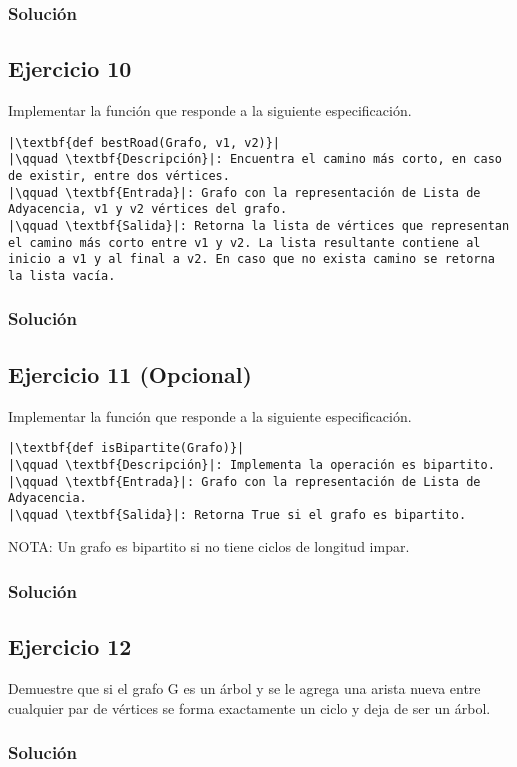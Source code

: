 \documentclass{article}
\begin{document}
\subsubsection*{Solución}


\subsection*{Ejercicio 10}
Implementar la función que responde a la siguiente especificación.
\begin{lstlisting}
|\textbf{def bestRoad(Grafo, v1, v2)}|
|\qquad \textbf{Descripción}|: Encuentra el camino más corto, en caso de existir, entre dos vértices.
|\qquad \textbf{Entrada}|: Grafo con la representación de Lista de Adyacencia, v1 y v2 vértices del grafo.
|\qquad \textbf{Salida}|: Retorna la lista de vértices que representan el camino más corto entre v1 y v2. La lista resultante contiene al inicio a v1 y al final a v2. En caso que no exista camino se retorna la lista vacía.
\end{lstlisting}
\subsubsection*{Solución}


\subsection*{Ejercicio 11 (Opcional)}
Implementar la función que responde a la siguiente especificación.
\begin{lstlisting}
|\textbf{def isBipartite(Grafo)}|
|\qquad \textbf{Descripción}|: Implementa la operación es bipartito.
|\qquad \textbf{Entrada}|: Grafo con la representación de Lista de Adyacencia.
|\qquad \textbf{Salida}|: Retorna True si el grafo es bipartito.
\end{lstlisting}
NOTA: Un grafo es bipartito si no tiene ciclos de longitud impar.
\subsubsection*{Solución}


\subsection*{Ejercicio 12}
Demuestre que si el grafo G es un árbol y se le agrega una arista nueva entre cualquier par de vértices se forma exactamente un ciclo y deja de ser un árbol.
\subsubsection*{Solución}
\end{document}
